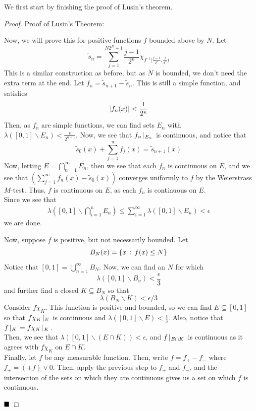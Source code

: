 
We first start by finishing the proof of Lusin's theorem. \\

\begin{proof}{Proof of Lusin's Theorem:}
    \vspace{0.2cm}

    Now, we will prove this for positive functions $f$ bounded above by $N$. Let 
    \[ \tilde{s}_n = \sum_{j = 1}^{N2^{N} + 1} \frac{j - 1}{2^{n}}\chi_{f^{-1}[\frac{j - 1}{2^{n}}, \frac{j}{2^{n}})} \]
    This is a similar construction as before, but as $N$ is bounded, we don't need the extra term at the end. Let $f_n = \tilde{s}_{n + 1} - \tilde{s}_{n}$. This is still a simple function, and satisfies
    \[ \left\lvert {f_n(x)} \right\rvert < \frac{1}{2^{n}} \]
    Then, as $f_n$ are simple functions, we can find sets $E_n$ with $\lambda([0, 1] \backslash E_n) < \frac{\epsilon}{2^{n + 1}}$. Now, we see that $f_n \left|_{E_{n}}\right.$ is continuous, and notice that
    \[ \tilde{s}_0(x) + \sum_{j = 1}^{n} f_{j}(x) = \tilde{s}_{n + 1}(x) \]
    Now, letting $E = \bigcap_{n = 1}^{\infty} E_n$, then we see that each $f_n$ is continuous on $E$, and we see that $(\sum_{j = 1}^{\infty} f_n(x) - \tilde{s}_0(x))$ converges uniformly to $f$ by the Weierstrass $M$-test. Thus, $f$ is continuous on $E$, as each $f_n$ is continuous on $E$. \\

    Since we see that
    \begin{align*}
        \lambda\left([0, 1] \backslash \bigcap_{i = 1}^{n} E_n\right) \leq \sum_{i = 1}^{\infty} \lambda([0, 1] \backslash E_n) < \epsilon
    \end{align*}
    we are done.
    \vspace{0.4cm}

    Now, suppose $f$ is positive, but not necessarily bounded. Let
    \[ B_{N}(x) = \{x \, :\, f(x) \leq N\} \]
    Notice that $[0, 1] = \bigcup_{n = 1}^{\infty} B_N$. Now, we can find an $N$ for which
    \[ \lambda([0, 1] \backslash B_n) < \frac{\epsilon}{3} \]
    and further find a closed $K \subseteq B_N$ so that
    \[ \lambda(B_N \backslash K) < \epsilon/3 \]
    Consider $f\chi_{K}$. This function is positive and bounded, so we can find $E \subseteq [0, 1]$ so that $f\chi_{K} \left|_{E}\right.$ is continuous and $\lambda([0, 1] \backslash E) < \frac{\epsilon}{3}$. Also, notice that $f \left|_{K}\right. = f\chi_{K}\left|_{K}\right.$. \\

    Then, we see that $\lambda([0, 1] \backslash (E \cap K)) < \epsilon$, and $f \left|_{E \cap K}\right.$ is continuous as it agrees with $f\chi_{K}$ on $E \cap K$.\\

    Finally, let $f$ be any measurable function. Then, write $f = f_{+} - f_{-}$ where $f_{\pm} = (\pm f) \vee 0$. Then, apply the previous step to $f_{+}$ and $f_{-}$, and the intersection of the sets on which they are continuous gives us a set on which $f$ is continuous.
    
    $\qed$
\end{proof}

